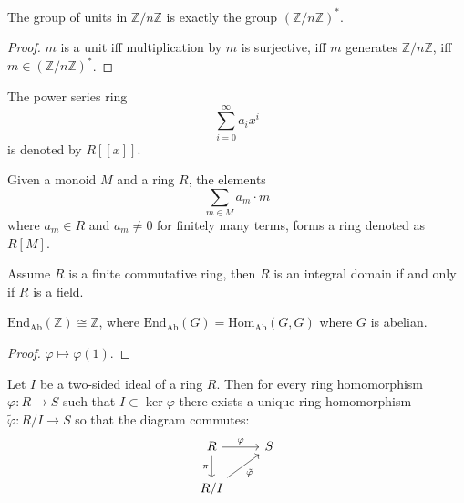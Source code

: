 \documentclass[openany]{book}
\newcommand{\Z}{\mathbb{Z}}
\begin{document}
\begin{prop}
    The group of units in $\Z/n\Z$ is exactly the group $(\Z/n\Z)^*$.
\end{prop}
\begin{proof}
    $m$ is a unit iff multiplication by $m$ is surjective, iff $m$ generates $\Z/n\Z$, iff $m\in(\Z/n\Z)^*$.
\end{proof}

\begin{defn}
    The power series ring 
    \begin{equation*}
        \sum_{i=0}^\infty a_ix^i
    \end{equation*}
    is denoted by $R[[x]]$.
\end{defn}

\begin{defn}
    Given a monoid $M$ and a ring $R$, the elements 
    \begin{equation*}
        \sum_{m\in M}a_m\cdot m
    \end{equation*}
    where $a_m\in R$ and $a_m\neq 0$ for finitely many  terms, forms a ring denoted as $R[M]$.
\end{defn}





\begin{prop}
    Assume $R$ is a finite commutative ring, then $R$ is an integral domain if and only if $R$ is a field.
\end{prop}




\begin{prop}
    $\text{End}_{\text{Ab}}(\Z)\cong\Z$, where $\text{End}_{\text{Ab}}(G)=\text{Hom}_{\text{Ab}}(G,G)$ where $G$ is abelian. 
\end{prop}
\begin{proof}
    $\varphi\mapsto\varphi(1)$.
\end{proof}



\begin{thm}
    Let $I$ be a two-sided ideal of a ring $R$. Then for every ring homomorphism $\varphi: R\to S$ such that $I\subset\ker\varphi$ there exists a unique ring homomorphism $\tilde{\varphi}: R/I\to S$ so that the diagram commutes:
    \[\begin{tikzcd}
        R & S \\
        {R/I}
        \arrow["\varphi", from=1-1, to=1-2]
        \arrow["\pi"', from=1-1, to=2-1]
        \arrow["{\tilde{\varphi}}"', from=2-1, to=1-2]
    \end{tikzcd}\]
\end{thm}
\end{document}
